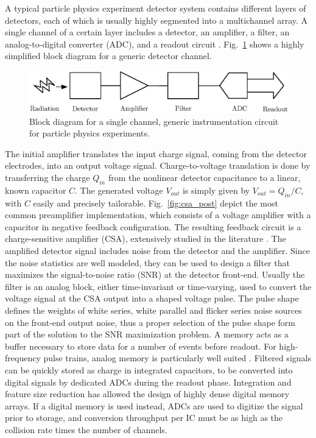 A typical particle physics experiment detector system contains different layers of detectors, each of which is usually highly segmented into a multichannel array. A single channel of a certain layer includes a detector, an amplifier, a filter, an analog-to-digital converter (ADC), and a readout circuit \citep{spieler2005semiconductor}. Fig.~\ref{fig:intint} shows a highly simplified block diagram for a generic detector channel. 

\begin{figure}
	\centering
    \includegraphics[width=5in]{./Figures/detector.eps}
	\caption{Block diagram for a single channel, generic instrumentation circuit for particle physics experiments.}
	\label{fig:intint}
\end{figure}

The initial amplifier translates the input charge signal, coming from the detector electrodes, into an output voltage signal. Charge-to-voltage translation is done by transferring the charge $Q_{in}$ from the nonlinear detector capacitance to a linear, known capacitor $C$. The generated voltage $V_{out}$ is simply given by $V_{out} = Q_{in}/C$, with $C$ easily and precisely tailorable. Fig.~\ref{fig:csa_post} depict the most common preamplifier implementation, which consists of a voltage amplifier with a capacitor in negative feedback configuration. The resulting feedback circuit is a charge-sensitive amplifier (CSA), extensively studied in the literature \citep{Snoeys100,Asp100,deGeronimo500,oconnor100,Alvarez101}. The amplified detector signal includes noise from the detector and the amplifier. Since the noise statistics are well modeled, they can be used to design a filter that maximizes the signal-to-noise ratio (SNR) at the detector front-end. Usually the filter is an analog block, either time-invariant or time-varying, used to convert the voltage signal at the CSA output into a shaped voltage pulse. The pulse shape defines the weights of white series, white parallel and flicker series noise sources on the front-end output noise, thus a proper selection of the pulse shape form part of the solution to the SNR maximization problem. A memory acts as a buffer necessary to store data for a number of events before readout. For high-frequency pulse trains, analog memory is particularly well suited \citep{Kleinfelder100,Haller100}. Filtered signals can be quickly stored as charge in integrated capacitors, to be converted into digital signals by dedicated ADCs during the readout phase. Integration and feature size reduction has allowed the design of highly dense digital memory arrays. If a digital memory is used instead, ADCs are used to digitize the signal prior to storage, and conversion throughput per IC must be as high as the collision rate times the number of channels. 

